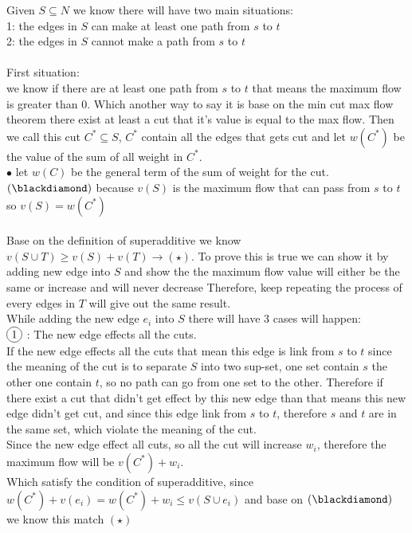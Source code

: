 \documentclass{article}
\newcommand*\circled[1]{\tikz[baseline=(char.base)]{
            \node[shape=circle,draw,inner sep=2pt] (char) {#1};}}
\begin{document}
Given $S \subseteq N$ we know there will have two main situations:\\
1: the edges in $S$ can make at least one path from $s$ to $t$\\
2: the edges in $S$ cannot make a path from $s$ to $t$\\\\
First situation:\\
we know if there are at least one path from $s$ to $t$ that means the maximum flow is greater than $0$. Which another way to say it is base on the min cut max flow theorem there exist at least a cut that it's value is equal to the max flow. Then we call this cut $C^* \subseteq S$, $C^*$ contain all the edges that gets cut and let $w(C^*)$ be the value of the sum of all weight in $C^*$.\\
$\bullet$ let $w(C)$ be the general term of the sum of weight for the cut.\\
$(\blackdiamond)$ because $v(S)$ is the maximum flow that can pass from $s$ to $t$ so $v(S) = w(C^*)$\\\\
Base on the definition of superadditive we know $v(S \cup T) \geq v(S) + v(T) \longrightarrow (\star)$. To prove this is true we can show it by adding new edge into $S$ and show the the maximum flow value will either be the same or increase and will never decrease Therefore, keep repeating the process of every edges in $T$ will give out the same result.\\
While adding the new edge $e_i$ into $S$ there will have $3$ cases will happen:\\
$\circled{1}$ : The new edge effects all the cuts.\\
If the new edge effects all the cuts that mean this edge is link from $s$ to $t$ since the meaning of the cut is to separate $S$ into two sup-set, one set contain $s$ the other one contain $t$, so no path can go from one set to the other. Therefore if there exist a cut that didn't get effect by this new edge than that means this new edge didn't get cut, and since this edge link from $s$ to $t$, therefore $s$ and $t$ are in the same set, which violate the meaning of the cut.\\
Since the new edge effect all cuts, so all the cut will increase $w_i$, therefore the maximum flow will be $v(C^*) + w_i$.\\
Which satisfy the condition of superadditive, since $w(C^*) + v(e_i) = w(C^*) + w_i \leq v(S \cup e_i)$ and base on $(\blackdiamond)$ we know this match $(\star)$\\\\
\end{document}
